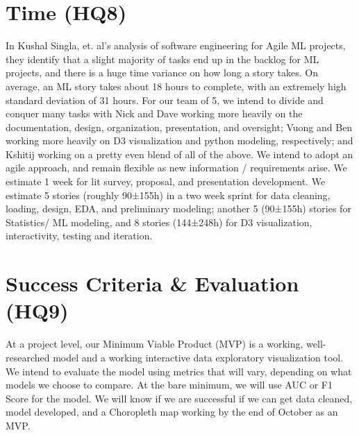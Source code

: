 \documentclass[sigconf,nonacm,11pt]{acmart}
\begin{document}
\section{Time (HQ8)}
In Kushal Singla, et. al's analysis \cite{mltime} of software engineering for Agile ML projects, they identify that a slight majority of tasks end up in the backlog for ML projects, and there is a huge time variance on how long a story takes. On average, an ML story takes about 18 hours to complete, with an extremely high standard deviation of 31 hours.  For our team of 5, we intend to divide and conquer many tasks with Nick and Dave working more heavily on the documentation, design, organization, presentation, and oversight; Vuong and Ben working more heavily on D3 visualization and python modeling, respectively; and Kshitij working on a pretty even blend of all of the above.  We intend to adopt an agile approach, and remain flexible as new information / requirements arise.  We estimate 1 week for lit survey, proposal, and presentation development.  We estimate 5 stories (roughly 90±155h) in a two week sprint for data cleaning, loading, design, EDA, and preliminary modeling; another 5 (90±155h) stories for Statistics/ ML modeling, and 8 stories (144±248h) for D3 visualization, interactivity, testing and iteration.

\section{Success Criteria \& Evaluation (HQ9)}
At a project level, our Minimum Viable Product (MVP) is a working, well-researched model and a working interactive data exploratory visualization tool. We intend to evaluate the model using metrics that will vary, depending on what models we choose to compare.  At the bare minimum, we will use AUC or F1 Score for the model. We will know if we are successful if we can get data cleaned, model developed, and a Choropleth map working by the end of October as an MVP.

\end{document}
